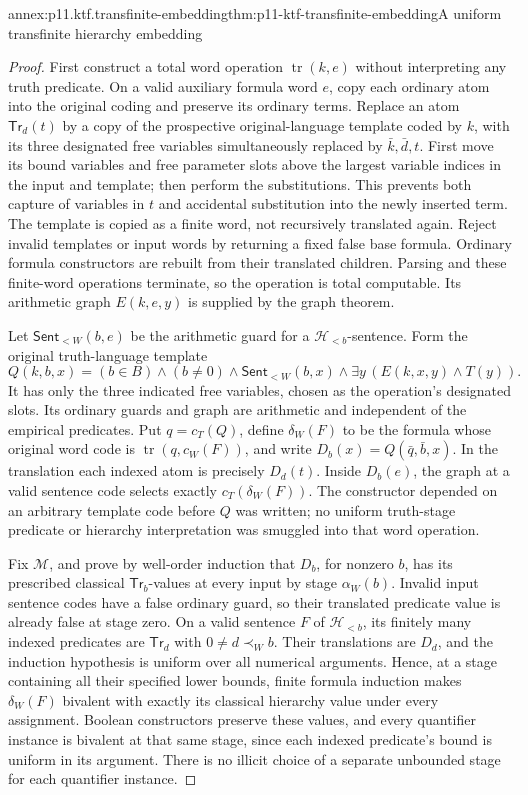 \begin{annexitem}{annex:p11.ktf.transfinite-embedding}{thm:p11-ktf-transfinite-embedding}{A uniform transfinite hierarchy embedding}
\begin{proof}
First construct a total word operation \(\operatorname{tr}(k,e)\)
without interpreting any truth predicate. On a valid auxiliary formula
word \(e\), copy each ordinary atom into the original coding
and preserve its ordinary terms. Replace an atom
\(\mathsf{Tr}_d(t)\) by a copy of the prospective original-language
template coded by \(k\), with its three designated free
variables simultaneously replaced by \(\bar k,\bar d,t\).
First move its bound variables and free parameter slots above
the largest variable indices in the input and template; then perform
the substitutions. This prevents both capture of variables in
\(t\) and accidental substitution into the newly inserted
term. The template is copied as a finite word, not recursively
translated again. Reject invalid templates or input words by returning
a fixed false base formula. Ordinary formula constructors are rebuilt
from their translated children. Parsing and these finite-word operations
terminate, so the operation is total computable. Its arithmetic
graph \(E(k,e,y)\) is supplied by the graph theorem.

Let \(\mathsf{Sent}_{<W}(b,e)\) be the arithmetic guard
for a \(\mathcal H_{<b}\)-sentence. Form the original
truth-language template
\[
 Q(k,b,x)=(b\in B)\land(b\ne0)\land
    \mathsf{Sent}_{<W}(b,x)\land
       \exists y\,(E(k,x,y)\land T(y)).
\]
It has only the three indicated free variables, chosen as the
operation's designated slots. Its ordinary guards and graph are
arithmetic and independent of the empirical predicates. Put
\(q=c_T(Q)\), define
\(\delta_W(F)\) to be the formula whose original word code
is \(\operatorname{tr}(q,c_W(F))\), and write
\(D_b(x)=Q(\bar q,\bar b,x)\).
In the translation each indexed atom is precisely \(D_d(t)\).
Inside \(D_b(e)\), the graph at a valid sentence code selects
exactly \(c_T(\delta_W(F))\). The constructor depended on
an arbitrary template code before \(Q\) was written; no uniform
truth-stage predicate or hierarchy interpretation was smuggled into
that word operation.

Fix \(\mathcal M\), and prove by well-order induction that
\(D_b\), for nonzero \(b\), has its prescribed classical
\(\mathsf{Tr}_b\)-values at every input by stage
\(\alpha_W(b)\). Invalid input sentence codes have a false
ordinary guard, so their translated predicate value is already
false at stage zero. On a valid sentence \(F\) of
\(\mathcal H_{<b}\), its finitely many indexed predicates
are \(\mathsf{Tr}_d\) with \(0\ne d\prec_W b\).
Their translations are \(D_d\), and the induction hypothesis
is uniform over all numerical arguments. Hence, at a stage containing
all their specified lower bounds, finite formula induction makes
\(\delta_W(F)\) bivalent with exactly its classical hierarchy
value under every assignment. Boolean constructors preserve these
values, and every quantifier instance is bivalent at that same
stage, since each indexed predicate's bound is uniform in its
argument. There is no illicit choice of a separate unbounded stage
for each quantifier instance.


\end{proof}
\end{annexitem}
